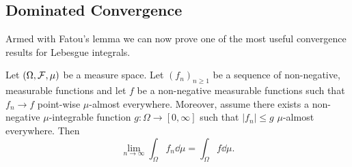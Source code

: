 \subsection{Dominated Convergence}

Armed with Fatou's lemma we can now prove one of the most useful convergence results for Lebesgue integrals.

\begin{theorem}\label{thm:dominated_convergence}
Let $(\Omega, \mathcal F, \mu)$ be a measure space. Let $(f_n)_{n \ge 1}$ be a sequence of non-negative, measurable functions and let $f$ be a non-negative measurable functions such that $f_n \to f$ point-wise $\mu$-almost everywhere. Moreover, assume there exists a non-negative $\mu$-integrable function $g : \Omega \to [0,\infty]$ such that $|f_n| \le g$ $\mu$-almost everywhere. Then
\[
	\lim_{n \to \infty} \int_\Omega f_n \dd \mu = \int_\Omega f \dd \mu.
\]
\end{theorem}

